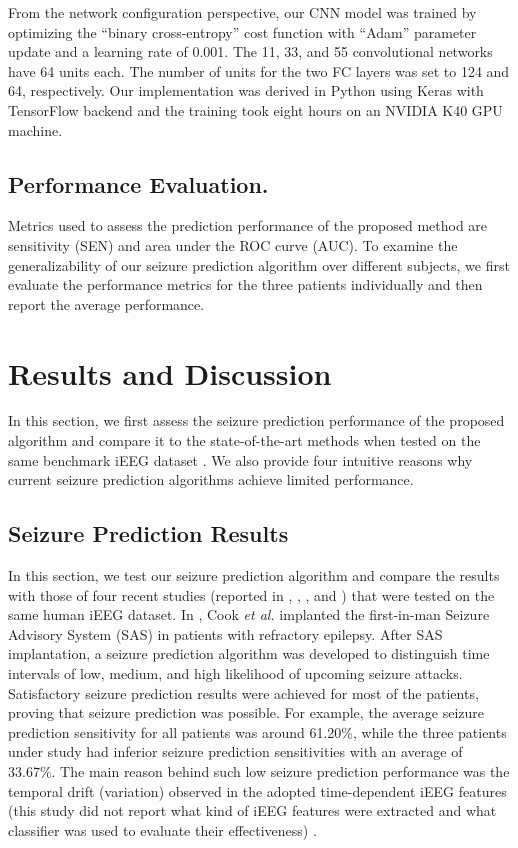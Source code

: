 \documentclass[journal]{IEEEtran}
\begin{document}
From the network configuration perspective, our CNN model was trained by optimizing the ``binary cross-entropy'' cost function with ``Adam'' parameter update and a learning rate of 0.001. The 11, 33, and 55 convolutional networks have 64 units each. The number of units for the two FC layers was set to 124 and 64, respectively. Our implementation was derived in Python using Keras with TensorFlow backend and the training took eight hours on an NVIDIA K40 GPU machine.

\subsection{Performance Evaluation.}

Metrics used to assess the prediction performance of the proposed method are sensitivity (SEN) and area under the ROC curve (AUC). To examine the generalizability of our seizure prediction algorithm over different subjects, we first evaluate the performance metrics for the three patients individually and then report the average performance.



\section{Results and Discussion}
\label{Section4}

In this section, we first assess the seizure prediction performance of the proposed algorithm and compare it to the state-of-the-art methods when tested on the same benchmark iEEG dataset \cite{cook2013prediction}. We also provide four intuitive reasons why current seizure prediction algorithms achieve limited performance.



\subsection{Seizure Prediction Results}

In this section, we test our seizure prediction algorithm and compare the results with those of four recent studies (reported in \cite{cook2013prediction}, \cite{karoly2016interictal}, \cite{karoly2017circadian}, and \cite{kiral2018epileptic}) that were tested on the same human iEEG dataset. In \cite{cook2013prediction}, Cook \textit{et al.} implanted the first-in-man Seizure Advisory System (SAS) in patients with refractory epilepsy. After SAS implantation, a seizure prediction algorithm was developed to distinguish time intervals of low, medium, and high likelihood of upcoming seizure attacks. Satisfactory seizure prediction results were achieved for most of the patients, proving that seizure prediction was possible. For example, the average seizure prediction sensitivity for all patients was around 61.20\%, while the three patients under study had inferior seizure prediction sensitivities with an average of 33.67\%.
The main reason behind such low seizure prediction performance was the temporal drift (variation) observed in the adopted time-dependent iEEG features (this study did not report what kind of iEEG features were extracted and what classifier was used to evaluate their effectiveness) \cite{cook2013prediction}.      
\end{document}
